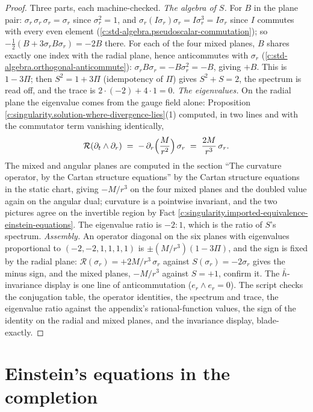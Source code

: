\documentclass[11pt]{article}
\theoremstyle{definition}
\theoremstyle{plain}
\providecommand{\er}{}\renewcommand{\er}{e_r}
\providecommand{\hb}{}\renewcommand{\hb}{\bar{h}}
\begin{document}
\begin{proof}
Three parts, each machine-checked. \emph{The algebra of $S$.} For $B$ in the plane pair: $\sigma_r\,\sigma_r\,\sigma_r = \sigma_r$ since $\sigma_r^2 = 1$, and $\sigma_r (I\sigma_r)\sigma_r = I\sigma_r^3 = I\sigma_r$ since $I$ commutes with every even element (\ref{c:std-algebra.pseudoscalar-commutation}); so $-\tfrac12(B + 3\sigma_r B\sigma_r) = -2B$ there. For each of the four mixed planes, $B$ shares exactly one index with the radial plane, hence anticommutes with $\sigma_r$ (\ref{c:std-algebra.orthogonal-anticommute}): $\sigma_r B \sigma_r = -B\sigma_r^2 = -B$, giving $+B$. This is $1 - 3\Pi$; then $S^2 = 1 + 3\Pi$ (idempotency of $\Pi$) gives $S^2 + S = 2$, the spectrum is read off, and the trace is $2\cdot(-2) + 4\cdot 1 = 0$. \emph{The eigenvalues.} On the radial plane the eigenvalue comes from the gauge field alone: Proposition \ref{c:singularity.solution-where-divergence-lies}(1) computed, in two lines and with the commutator term vanishing identically,
\[
\mathcal{R}(\partial_t \wedge \partial_r) \;=\; -\,\partial_r\Bigl(\frac{M}{r^2}\Bigr)\,\sigma_r \;=\; \frac{2M}{r^3}\,\sigma_r .
\]
The mixed and angular planes are computed in the section ``The curvature operator, by the Cartan structure equations'' by the Cartan structure equations in the static chart, giving $-M/r^3$ on the four mixed planes and the doubled value again on the angular dual; curvature is a pointwise invariant, and the two pictures agree on the invertible region by Fact \ref{c:singularity.imported-equivalence-einstein-equations}. The eigenvalue ratio is $-2 : 1$, which is the ratio of $S$'s spectrum. \emph{Assembly.} An operator diagonal on the six planes with eigenvalues proportional to $(-2,-2,1,1,1,1)$ is $\pm(M/r^3)(1 - 3\Pi)$, and the sign is fixed by the radial plane: $\mathcal{R}(\sigma_r) = +2M/r^{3}\,\sigma_r$ against $S(\sigma_r) = -2\sigma_r$ gives the minus sign, and the mixed planes, $-M/r^{3}$ against $S = +1$, confirm it. The $\hb$-invariance display is one line of anticommutation ($\er \wedge \er = 0$). The script checks the conjugation table, the operator identities, the spectrum and trace, the eigenvalue ratio against the appendix's rational-function values, the sign of the identity on the radial and mixed planes, and the invariance display, blade-exactly.

\end{proof}

\section{Einstein's equations in the completion}
\end{document}
